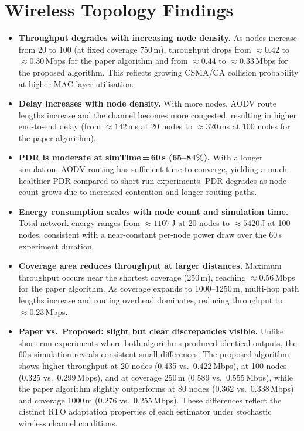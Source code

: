 \documentclass[12pt,a4paper]{report}
\begin{document}
\section{Wireless Topology Findings}

\begin{itemize}
  \item \textbf{Throughput degrades with increasing node density.}
        As nodes increase from 20 to 100 (at fixed coverage 750\,m), throughput
        drops from $\approx0.42$ to $\approx0.30$\,Mbps for the paper algorithm
        and from $\approx0.44$ to $\approx0.33$\,Mbps for the proposed algorithm.
        This reflects growing CSMA/CA collision probability at higher
        MAC-layer utilisation.
  \item \textbf{Delay increases with node density.}
        With more nodes, AODV route lengths increase and the channel becomes
        more congested, resulting in higher end-to-end delay
        (from $\approx142$\,ms at 20 nodes to $\approx320$\,ms at 100 nodes
        for the paper algorithm).
  \item \textbf{PDR is moderate at simTime\,=\,60\,s (65--84\%).}
        With a longer simulation, AODV routing has sufficient time to converge,
        yielding a much healthier PDR compared to short-run experiments.
        PDR degrades as node count grows due to increased contention and
        longer routing paths.
  \item \textbf{Energy consumption scales with node count and simulation time.}
        Total network energy ranges from $\approx1107$\,J at 20 nodes to
        $\approx5420$\,J at 100 nodes, consistent with a near-constant
        per-node power draw over the 60\,s experiment duration.
  \item \textbf{Coverage area reduces throughput at larger distances.}
        Maximum throughput occurs near the shortest coverage (250\,m),
        reaching $\approx0.56$\,Mbps for the paper algorithm.  As coverage
        expands to 1000--1250\,m, multi-hop path lengths increase and
        routing overhead dominates, reducing throughput to $\approx0.23$\,Mbps.
  \item \textbf{Paper vs.\ Proposed: slight but clear discrepancies visible.}
        Unlike short-run experiments where both algorithms produced identical
        outputs, the 60\,s simulation reveals consistent small differences.
        The proposed algorithm shows higher throughput at 20 nodes
        (0.435 vs.\ 0.422\,Mbps), at 100 nodes (0.325 vs.\ 0.299\,Mbps),
        and at coverage 250\,m (0.589 vs.\ 0.555\,Mbps), while the paper
        algorithm slightly outperforms at 80 nodes (0.362 vs.\ 0.338\,Mbps)
        and coverage 1000\,m (0.276 vs.\ 0.255\,Mbps).
        These differences reflect the distinct RTO adaptation properties of
        each estimator under stochastic wireless channel conditions.
\end{itemize}
\end{document}

